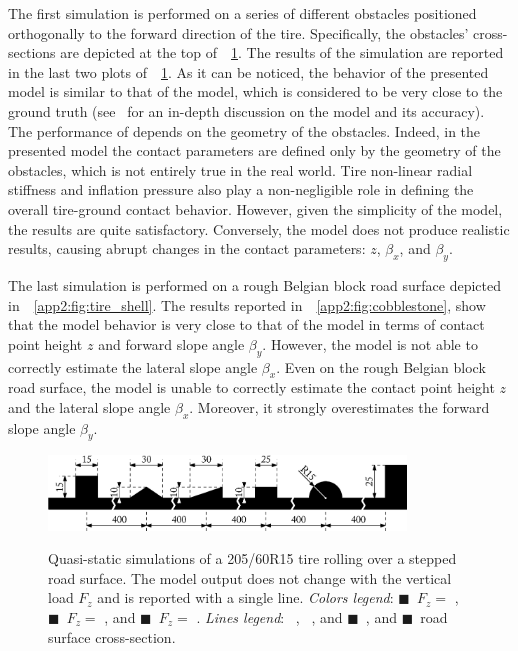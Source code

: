 The first simulation is performed on a series of different obstacles positioned orthogonally to the forward direction of the tire. Specifically, the obstacles' cross-sections are depicted at the top of~\figurename{}~\ref{app2:fig:steps}. The results of the simulation are reported in the last two plots of~\figurename{}~\ref{app2:fig:steps}. As it can be noticed, the behavior of the presented model is similar to that of the \Swift{} model, which is considered to be very close to the ground truth (see~\cite{schmeitz2004semiempirical} for an in-depth discussion on the \Swift{} model and its accuracy). The performance of \Enve{} depends on the geometry of the obstacles. Indeed, in the presented model the contact parameters are defined only by the geometry of the obstacles, which is not entirely true in the real world. Tire non-linear radial stiffness and inflation pressure also play a non-negligible role in defining the overall tire-ground contact behavior. However, given the simplicity of the model, the results are quite satisfactory. Conversely, the \TMEasy{} model does not produce realistic results, causing abrupt changes in the contact parameters: $z$, $\beta_x$, and $\beta_y$.

The last simulation is performed on a rough Belgian block road surface depicted in~\figurename{}~\ref{app2:fig:tire_shell}. The results reported in~\figurename{}~\ref{app2:fig:cobblestone}, show that the \Enve{} model behavior is very close to that of the \Swift{} model in terms of contact point height $z$ and forward slope angle $\beta_y$. However, the \Enve{} model is not able to correctly estimate the lateral slope angle $\beta_x$. Even on the rough Belgian block road surface, the \TMEasy{} model is unable to correctly estimate the contact point height $z$ and the lateral slope angle $\beta_x$. Moreover, it strongly overestimates the forward slope angle $\beta_y$.

\begin{figure}[!htb]
  \centering
  \hspace{1.5cm}\includegraphics[width=9.5cm]{./figures/appendix_2/steps_ipe}\\[0.1in]
  \caption{Quasi-static simulations of a 205/60R15 tire rolling over a stepped road surface. The \TMEasy{} model output does not change with the vertical load $F_z$ and is reported with a single line. \emph{Colors legend}: {\color{mycolor1}$\blacksquare$}~$F_z =$ , {\color{mycolor2}$\blacksquare$}~$F_z =$ , and {\color{mycolor3}$\blacksquare$}~$F_z =$ . \emph{Lines legend}: \raisebox{1.0pt}{\textbf{---}}~\Enve{}, \raisebox{1.0pt}{\textbf{--~--}}~\Swift{}, and {\color{mycolor5}$\blacksquare$}~\TMEasy{}, and {\color{black}$\blacksquare$}~road surface cross-section.}
  \label{app2:fig:steps}
\end{figure}

